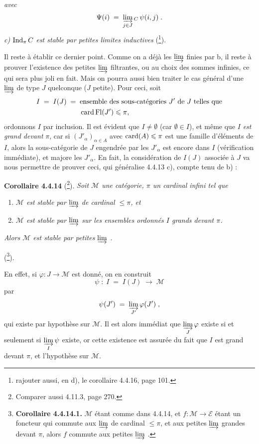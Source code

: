 
\textit{avec}
\[
\Psi(i) \;=\; \varinjlim_{j\in J}{}_{C}\,\psi(i,j)\;.
\]
\textit{c)} $\operatorname{Ind}_\pi C$ \textit{est stable par petites limites inductives} (\footnote{rajouter aussi, en d), le corollaire 4.4.16, page 101.}).

Il reste à établir ce dernier point. Comme on a déjà les $\varinjlim$ finies par b, il reste à prouver l'existence des petites $\varinjlim$ filtrantes, ou au choix des sommes infinies, ce qui sera plus joli en fait. Mais
on pourra aussi bien traiter le cas général d'une $\varinjlim$ de type $J$ quelconque ($J$ petite). Pour ceci, soit
\[
I \;=\; I(J) \;=\; \begin{aligned}[t]
&\text{ensemble des sous-catégories } J' \text{ de } J \text{ telles que}\\
&\operatorname{card}\operatorname{Fl}(J')\leqslant\pi,
\end{aligned}
\]
ordonnons $I$ par inclusion. Il est évident que $I\neq\emptyset$ (car $\emptyset\in I$), et même que $I$ \textit{est grand devant} $\pi$, car si $(J'_\alpha)_{\alpha\in A}$ avec $\operatorname{card}(A)\leqslant\pi$ est une famille d'éléments de $I$, alors la sous-catégorie de $J$ engendrée par les $J'_\alpha$ est encore dans $I$ (vérification immédiate), et majore les $J'_\alpha$. En fait, la considération de $I(J)$ associée à $J$ va nous permettre de prouver ceci, qui généralise 4.4.13 c), compte tenu de b) :

\textbf{Corollaire 4.4.14} (\footnote{Comparer aussi 4.11.3, page 270.}). \textit{Soit $\mathcal{M}$ une catégorie, $\pi$ un cardinal infini tel que}
\begin{enumerate}
\item[a)] \textit{$\mathcal{M}$ est}
\textit{stable par $\varinjlim$ de cardinal $\leqslant\pi$, et}
\item[b)] \textit{$\mathcal{M}$ est stable par $\varinjlim$ sur les ensembles ordonnés $I$ grands devant $\pi$.}
\end{enumerate}
\textit{Alors $\mathcal{M}$ est stable par petites $\varinjlim$ .}

(\footnote{\textbf{Corollaire 4.4.14.1.} $\mathcal{M}$ étant comme dans 4.4.14, et $f:\mathcal{M}\longrightarrow\mathcal{E}$ étant un foncteur qui commute aux $\varinjlim$ de cardinal $\leqslant\pi$, et aux petites $\varinjlim$ grandes devant $\pi$, alors $f$ commute aux petites $\varinjlim$ .}).

En effet, si $\varphi:J\longrightarrow\mathcal{M}$ est donné, on en construit
\[
\psi\;:\;I\;=\;I(J)\;\longrightarrow\;\mathcal{M}
\]
par
\[
\psi(J')\;=\;\varinjlim_{J'}\varphi(J')\;,
\]
qui existe par hypothèse sur $\mathcal{M}$. Il est alors immédiat que $\varinjlim\limits_{J}\varphi$ existe si et seulement si $\varinjlim\limits_{I}\psi$ existe, or cette existence est assurée du fait que $I$ est grand devant $\pi$, et l'hypothèse sur $\mathcal{M}$.

